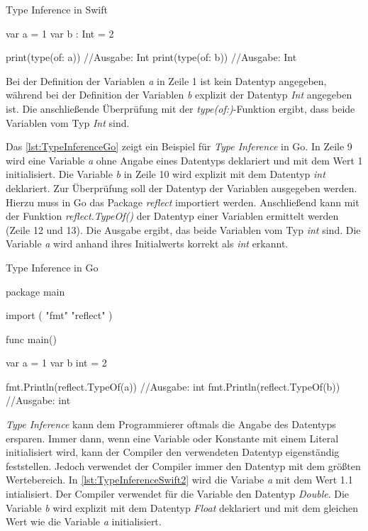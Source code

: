 \begin{listing}[H]
\caption{Type Inference in Swift}
\label{lst:TypeInferenceSwift}
\begin{SwiftCode}
var a = 1
var b : Int = 2

print(type(of: a)) //Ausgabe: Int
print(type(of: b)) //Ausgabe: Int
\end{SwiftCode}
\end{listing}

Bei der Definition der Variablen \emph{a} in Zeile 1 ist kein Datentyp angegeben, während bei der Definition der Variablen \emph{b} explizit der Datentyp \emph{Int} angegeben ist.
Die anschließende Überprüfung mit der \emph{type(of:)}-Funktion ergibt, dass beide Variablen vom Typ \emph{Int} sind.

Das \autoref{lst:TypeInferenceGo} zeigt ein Beispiel für \emph{Type Inference} in Go. 
In Zeile 9 wird eine Variable \emph{a} ohne Angabe eines Datentyps deklariert und mit dem Wert 1 initialisiert.
Die Variable \emph{b} in Zeile 10 wird explizit mit dem Datentyp \emph{int} deklariert.
Zur Überprüfung soll der Datentyp der Variablen ausgegeben werden. 
Hierzu muss in Go das Package \emph{reflect} importiert werden. 
Anschließend kann mit der Funktion \emph{reflect.TypeOf()} der Datentyp einer Variablen ermittelt werden (Zeile 12 und 13).
Die Ausgabe ergibt, das beide Variablen vom Typ \emph{int} sind. 
Die Variable \emph{a} wird anhand ihres Initialwerts korrekt als \emph{int} erkannt. 

\begin{listing}[H]
\caption{Type Inference in Go}
\label{lst:TypeInferenceGo}
\begin{GoCode}
package main

import (
    "fmt"
    "reflect"
)

func main() {
    var a = 1
    var b int = 2
	
    fmt.Println(reflect.TypeOf(a)) //Ausgabe: int
    fmt.Println(reflect.TypeOf(b)) //Ausgabe: int
}
\end{GoCode}
\end{listing}

\emph{Type Inference} kann dem Programmierer oftmals die Angabe des Datentyps ersparen. 
Immer dann, wenn eine Variable oder Konstante mit einem Literal initialisiert wird, kann der Compiler den verwendeten Datentyp eigenständig feststellen. 
Jedoch verwendet der Compiler immer den Datentyp mit dem größten Wertebereich.
In \autoref{lst:TypeInferenceSwift2} wird die Variabe \emph{a} mit dem Wert 1.1 intialisiert.
Der Compiler verwendet für die Variable den Datentyp \emph{Double}.
Die Variable \emph{b} wird explizit mit dem Datentyp \emph{Float} deklariert und mit dem gleichen Wert wie die Variable \emph{a} initialisiert.

